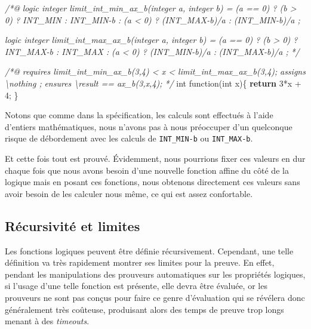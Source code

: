 \documentclass[12pt,francais,]{scrbook}
\newenvironment{Shaded}{}{}
\newcommand{\KeywordTok}[1]{\textcolor[rgb]{0.00,0.44,0.13}{\textbf{{#1}}}}
\newcommand{\DataTypeTok}[1]{\textcolor[rgb]{0.56,0.13,0.00}{{#1}}}
\newcommand{\DecValTok}[1]{\textcolor[rgb]{0.25,0.63,0.44}{{#1}}}
\newcommand{\CommentTok}[1]{\textcolor[rgb]{0.38,0.63,0.69}{\textit{{#1}}}}
\newcommand{\NormalTok}[1]{{#1}}
\newenvironment{zdsblock}[1]{%
  \tcolorbox[beamer,%
    noparskip,breakable,
    colback=LightBlue,colframe=DarkBlue,%
    colbacklower=DarkBlue,%
    title=#1]
}{\endtcolorbox}
\begin{document}
\begin{footnotesize}\begin{Shaded}
\begin{Highlighting}[]
\CommentTok{/*@}
\CommentTok{  logic integer limit_int_min_ax_b(integer a, integer b) =}
\CommentTok{    (a == 0) ? (b > 0) ? INT_MIN : INT_MIN-b :}
\CommentTok{    (a <  0) ? (INT_MAX-b)/a :}
\CommentTok{               (INT_MIN-b)/a ;}

\CommentTok{  logic integer limit_int_max_ax_b(integer a, integer b) =}
\CommentTok{    (a == 0) ? (b > 0) ? INT_MAX-b : INT_MAX :}
\CommentTok{    (a <  0) ? (INT_MIN-b)/a :}
\CommentTok{               (INT_MAX-b)/a ;}
\CommentTok{*/}

\CommentTok{/*@}
\CommentTok{  requires limit_int_min_ax_b(3,4) < x < limit_int_max_ax_b(3,4);}
\CommentTok{  assigns \textbackslash{}nothing ;}
\CommentTok{  ensures \textbackslash{}result == ax_b(3,x,4);}
\CommentTok{*/}
\DataTypeTok{int} \NormalTok{function(}\DataTypeTok{int} \NormalTok{x)\{}
  \KeywordTok{return} \DecValTok{3}\NormalTok{*x + }\DecValTok{4}\NormalTok{;}
\NormalTok{\}}
\end{Highlighting}
\end{Shaded}\end{footnotesize}

\begin{zdsblock}{Information}
  Notons que comme dans la spécification, les calculs sont effectués à
  l'aide d'entiers mathématiques, nous n'avons pas à nous préoccuper d'un
  quelconque risque de débordement avec les calculs de \texttt{INT\_MIN-b}
  ou \texttt{INT\_MAX-b}.
\end{zdsblock}

Et cette fois tout est prouvé. Évidemment, nous pourrions fixer ces
valeurs en dur chaque fois que nous avons besoin d'une nouvelle fonction
affine du côté de la logique mais en posant ces fonctions, nous obtenons
directement ces valeurs sans avoir besoin de les calculer nous même, ce
qui est assez confortable.

\subsection{Récursivité et limites}\label{ruxe9cursivituxe9-et-limites}

Les fonctions logiques peuvent être définie récursivement. Cependant,
une telle définition va très rapidement montrer ses limites pour la
preuve. En effet, pendant les manipulations des prouveurs automatiques
sur les propriétés logiques, si l'usage d'une telle fonction est
présente, elle devra être évaluée, or les prouveurs ne sont pas conçus
pour faire ce genre d'évaluation qui se révélera donc généralement très
coûteuse, produisant alors des temps de preuve trop longs menant à des
\emph{timeouts}.
\end{document}
